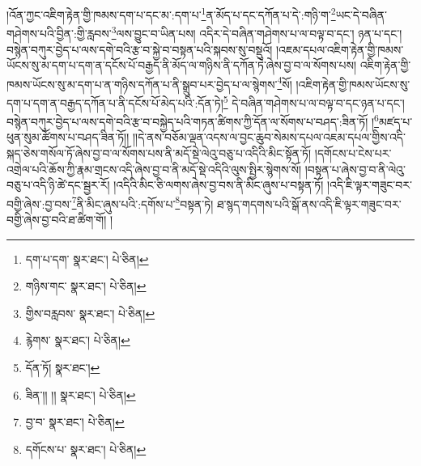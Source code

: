 །འོན་ཀྱང་འཇིག་རྟེན་གྱི་ཁམས་དག་པ་དང་མ་:དག་པ་\footnote{དག་པ་དག་  སྣར་ཐང་།  པེ་ཅིན། }ན་མོད་པ་དང་དཀོན་པ་དེ་:གཉི་ག་\footnote{གཉིས་གང་  སྣར་ཐང་།  པེ་ཅིན། }ཡང་དེ་བཞིན་གཤེགས་པའི་བྱིན་:གྱི་རླབས་\footnote{གྱིས་བརླབས་  སྣར་ཐང་།  པེ་ཅིན། }ལས་བྱུང་བ་ཡིན་པས། འདིར་དེ་བཞིན་གཤེགས་པ་ལ་བལྟ་བ་དང་། ཉན་པ་དང་། བསྙེན་བཀུར་བྱེད་པ་ལས་དགེ་བའི་རྩ་བ་སྐྱེ་བ་བསྟན་པའི་སྐབས་སུ་བསྡུའོ། །འཇམ་དཔལ་འཇིག་རྟེན་གྱི་ཁམས་ཡོངས་སུ་མ་དག་པ་དག་ན་དངོས་པོ་བརྒྱད་ནི་མོད་ལ་གཉིས་ནི་དཀོན་ཏེ་ཞེས་བྱ་བ་ལ་སོགས་པས། འཇིག་རྟེན་གྱི་ཁམས་ཡོངས་སུ་མ་དག་པ་ན་གཉིས་དཀོན་པ་ནི་སྒྲུབ་པར་བྱེད་པ་ལ་སྙེགས་\footnote{རྙེགས་  སྣར་ཐང་།  པེ་ཅིན། }སོ། །འཇིག་རྟེན་གྱི་ཁམས་ཡོངས་སུ་དག་པ་དག་ན་བརྒྱད་དཀོན་པ་ནི་དངོས་པོ་མེད་པའི་:དོན་ཏེ།\footnote{དོན་ཏོ།  སྣར་ཐང་། } དེ་བཞིན་གཤེགས་པ་ལ་བལྟ་བ་དང་ཉན་པ་དང་། བསྙེན་བཀུར་བྱེད་པ་ལས་དགེ་བའི་རྩ་བ་བསྐྱེད་པའི་གཏན་ཚིགས་ཀྱི་དོན་ལ་སོགས་པ་བཤད་:ཟིན་ཏོ། །\footnote{ཟིན་།། །།  སྣར་ཐང་།  པེ་ཅིན། }མཛད་པ་ཕུན་སུམ་ཚོགས་པ་བཤད་ཟིན་ཏོ།། །།དེ་ནས་བཅོམ་ལྡན་འདས་ལ་བྱང་ཆུབ་སེམས་དཔལ་འཇམ་དཔལ་གྱིས་འདི་སྐད་ཅེས་གསོལ་ཏོ་ཞེས་བྱ་བ་ལ་སོགས་པས་ནི་མདོ་སྡེ་ལེའུ་བཅུ་པ་འདིའི་མིང་སྟོན་ཏོ། །དགོངས་པ་ངེས་པར་འགྲེལ་པའི་ཆོས་ཀྱི་རྣམ་གྲངས་འདི་ཞེས་བྱ་བ་ནི་མདོ་སྡེ་འདིའི་ལུས་སྤྱིར་སྙེགས་སོ། །བསྟན་པ་ཞེས་བྱ་བ་ནི་ལེའུ་བཅུ་པ་འདི་ཉི་ཚེ་དང་སྦྱར་རོ། །འདིའི་མིང་ཅི་ལགས་ཞེས་བྱ་བས་ནི་མིང་ཞུས་པ་བསྟན་ཏོ། །འདི་ཇི་ལྟར་གཟུང་བར་བགྱི་ཞེས་:བྱ་བས་\footnote{བྱ་བ་  སྣར་ཐང་།  པེ་ཅིན། }ནི་མིང་ཞུས་པའི་:དགོས་པ་\footnote{དགོངས་པ་  སྣར་ཐང་།  པེ་ཅིན། }བསྟན་ཏེ། ཐ་སྙད་གདགས་པའི་སྒོ་ནས་འདི་ཇི་ལྟར་གཟུང་བར་བགྱི་ཞེས་བྱ་བའི་ཐ་ཚིག་གོ། །
